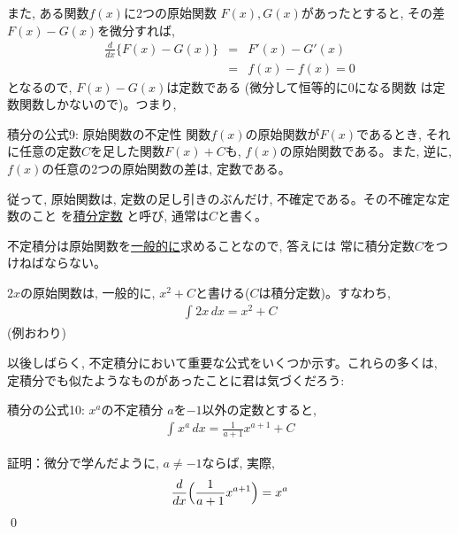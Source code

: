 また, ある関数$f(x)$に2つの原始関数
$F(x), G(x)$があったとすると, その差$F(x)-G(x)$を微分すれば, 
\begin{eqnarray}
\frac{d}{dx}\{F(x)-G(x)\}&=&F'(x)-G'(x)\\
&=&f(x)-f(x)=0
\end{eqnarray}
となるので, $F(x)-G(x)$は定数である (微分して恒等的に0になる関数
は定数関数しかないので)。つまり, 

\begin{itembox}{積分の公式9: 原始関数の不定性}
関数$f(x)$の原始関数が$F(x)$であるとき, それに任意の定数$C$を足した関数$F(x)+C$も, 
$f(x)$の原始関数である。また, 逆に, $f(x)$の任意の2つの原始関数の差は, 定数である。
\end{itembox}

従って, 原始関数は, 定数の足し引きのぶんだけ, 不確定である。その不確定な定数のこと
を\underline{積分定数} と呼び, 通常は$C$と書く。

不定積分は原始関数を\underline{一般的に}求めることなので, 答えには
常に積分定数$C$をつけねばならない。

\begin{exmpl}\label{exmpl:futeisekibun_2x_xx_3}
$2x$の原始関数は, 一般的に, $x^2+C$と書ける($C$は積分定数)。すなわち, 
\begin{eqnarray}
\int_{}^{} 2x\, dx=x^2+C
\end{eqnarray}
(例おわり)
\end{exmpl}

\begin{freqmiss}{\small{}}\end{freqmiss}

以後しばらく, 不定積分において重要な公式をいくつか示す。これらの多くは, 
定積分でも似たようなものがあったことに君は気づくだろう:\hv

\begin{itembox}{積分の公式10: $x^a$の不定積分}
$a$を$-1$以外の定数とすると, 
\begin{eqnarray}
\int_{}^{} x^a \,dx=\frac{1}{a+1}x^{a+1}+C\label{eq:futeisekibun_koshiki10}
\end{eqnarray}
\end{itembox}
証明：微分で学んだように, $a \ne -1$ならば, 実際, 
\begin{eqnarray}\frac{d}{dx}\Bigl(\frac{1}{a+1}x^{a+1}\Bigr)=x^a\end{eqnarray}
\qed

